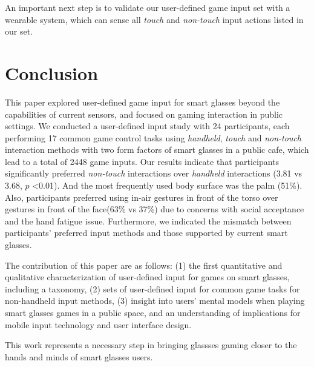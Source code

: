 \documentclass{sigchi}
\begin{document}
  An important next step is to validate our user-defined game input set with a wearable system, which can sense all \emph{touch} and \emph{non-touch} input actions listed in our set.   


\section{Conclusion}

This paper explored user-defined game input for smart glasses beyond the capabilities of current sensors, and focused on gaming interaction in public settings. We conducted a user-defined input study with 24 participants, each performing 17 common game control tasks using \emph{handheld}, \emph{touch} and \emph{non-touch} interaction methods with two form factors of smart glasses in a public cafe, which lead to a total of 2448 game inputs. Our results indicate that participants significantly preferred \emph{non-touch} interactions over \emph{handheld} interactions (3.81 vs 3.68, $p$ \textless 0.01). And the most frequently used body surface was the palm (51\%). Also, participants preferred using in-air gestures in front of the torso over gestures in front of the face(63\% vs 37\%) due to concerns with social acceptance and the hand fatigue issue. Furthermore, we indicated the mismatch between participants' preferred input methods and those supported by current smart glasses.

The contribution of this paper are as follows: (1) the first quantitative and qualitative characterization of user-defined input for games on smart glasses, including a taxonomy, (2) sets of user-defined input for common game tasks for non-handheld input methods, (3) insight into users' mental models when playing smart glasses games in a public space, and an understanding of implications for mobile input technology and user interface design.

This work represents a necessary step in bringing glassses gaming closer to the hands and minds of smart glasses users.


\end{document}
